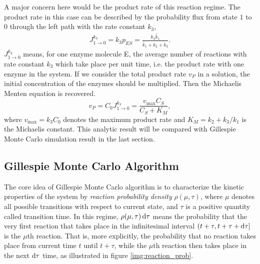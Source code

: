 		A major concern here would be the product rate of this reaction regime. The product rate in this case can be described by the probability flux from state $1$ to $0$ through the left path with the rate constant $k_3$,
		\begin{equation}
			\begin{aligned}
				J_{1\rightarrow0}^{k_3} = k_3 p_{ES} 
					= \frac{k_3 \widetilde{k_1}}{\widetilde{k_1}+k_2+k_3} . 
			\end{aligned}
		\end{equation}
		$J_{1\rightarrow0}^{k_3}$ means, for one enzyme molecule E, the average number of reactions with rate constant $k_3$ which take place per unit time, i.e. the product rate with one enzyme in the system. If we consider the total product rate $v_P$ in a solution, the initial concentration of the enzymes should be multiplied. Then the Michaelis Menten equation \cite{michaelis1913} is recovered.
		\begin{equation}
				v_P = C_0 J_{1\rightarrow0}^{k_3} = \frac{v_{\text{max}} C_S}{C_S + K_M},
				\label{eq:MM}
		\end{equation}
		where $v_{\text{max}}=k_3C_0$ denotes the maximum product rate and $K_M=k_2+k_3/k_1$ is the Michaelis constant. This analytic result will be compared with Gillespie Monte Carlo simulation result in the last section.

	\subsection{Gillespie Monte Carlo Algorithm}

		The core idea of Gillespie Monte Carlo algorithm \cite{gillespie1976,gillespie1977} is to characterize the kinetic properties of the system by \textit{reaction probability density} $\rho(\mu,\tau)$, where $\mu$ denotes all possible transitions with respect to current state, and $\tau$ is a positive quantity called transition time. In this regime, $\rho(\mu,\tau)\operatorname{d\!} \tau$ means the probability that the very first reaction that takes place in the infinitesimal interval $(t+\tau, t+\tau + \operatorname{d\!} \tau]$ is the $\mu$th reaction. That is, more explicitly, the probability that no reaction takes place from current time $t$ until $t+\tau$, while the $\mu$th reaction then takes place in the next $\operatorname{d\!} \tau$ time, as illustrated in figure \ref{img:reaction_prob}.

